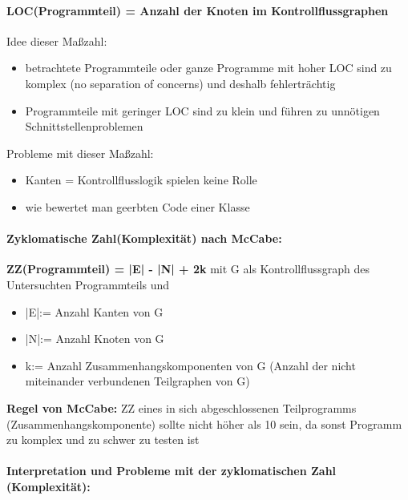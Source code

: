 \paragraph{LOC(Programmteil) = Anzahl der Knoten im Kontrollflussgraphen} 
Idee dieser Maßzahl:
\begin{itemize}
	\item betrachtete Programmteile oder ganze Programme mit hoher LOC sind zu komplex (no separation of concerns) und deshalb fehlerträchtig
	\item Programmteile mit geringer LOC sind zu klein und führen zu unnötigen Schnittstellenproblemen
\end{itemize}
Probleme mit dieser Maßzahl:
\begin{itemize}
	\item Kanten = Kontrollflusslogik spielen keine Rolle
	\item wie bewertet man geerbten Code einer Klasse
\end{itemize}

\paragraph{Zyklomatische Zahl(Komplexität) nach McCabe:}
\textbf{ZZ(Programmteil) = |E| - |N| + 2k} mit G als Kontrollflussgraph des Untersuchten Programmteils und
\begin{itemize}
	\item |E|:= Anzahl Kanten von G
	\item |N|:= Anzahl Knoten von G
	\item k:= Anzahl Zusammenhangskomponenten von G (Anzahl der nicht miteinander verbundenen Teilgraphen von G)
\end{itemize}

\textbf{Regel von McCabe:} ZZ eines in sich abgeschlossenen Teilprogramms (Zusammenhangskomponente) sollte nicht höher als 10 sein, da sonst Programm zu komplex und zu schwer zu testen ist

\paragraph{Interpretation und Probleme mit der zyklomatischen Zahl (Komplexität):}

